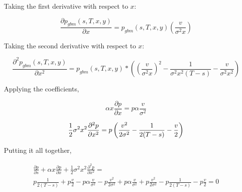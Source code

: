 \documentclass{article}
\theoremstyle{definition}
\begin{document}
Taking the first derivative with respect to \(x\):

\[\frac{\partial p_{gbm}(s, T, x, y)}{\partial x}=  p_{gbm}(s, T, x, y)\left(\frac{v }{\sigma^2 x}\right)  \]

Taking the second derivative with respect to \(x\):

\[\frac{\partial^2 p_{gbm}(s, T, x, y)}{\partial x^2}=  p_{gbm}(s, T, x, y)*\left(  \left(\frac{v }{\sigma^2 x}\right)^2 -\frac{1}{\sigma^2 x^2 (T-s)} - \frac{v }{\sigma^2 x^2}   \right)\]

Applying the coefficients,

\[\alpha x \frac{\partial p}{\partial x}=p \alpha \frac{v }{\sigma^2 }\]

\[\frac{1}{2} \sigma^2 x^2 \frac{\partial^2 p}{\partial x^2}\\=p\left( \frac{v^2 }{2\sigma^2}- \frac{1}{ 2(T-s)} - \frac{v }{ 2}      \right)\]

Putting it all together,



\begin{multline*}
\frac{\partial p} {\partial s} +\alpha x \frac{\partial p}{\partial x} + \frac{1}{2} \sigma^2 x^2 \frac{\partial^2 p}{\partial x^2}= \\ p\frac{1}{2(T-s)} + p\frac{v}{2}   - p \alpha \frac{v}{\sigma^2}  -p\frac{v^2}{2\sigma^2}  +  p \alpha \frac{v }{\sigma^2} + p\frac{v^2 }{2\sigma^2 }- p\frac{1}{ 2(T-s)} -p \frac{v }{ 2} =0
\end{multline*}
\end{document}
